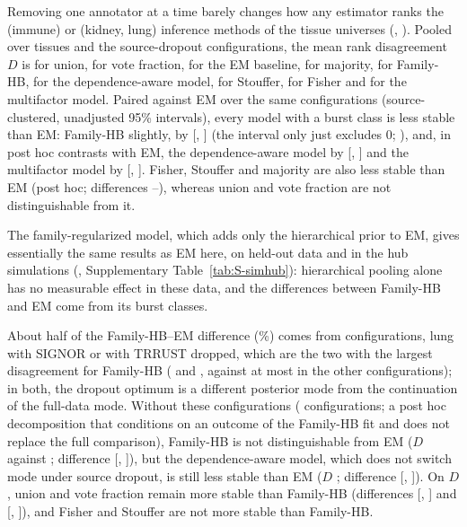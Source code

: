 Removing one annotator at a time barely changes how any estimator ranks the \nRobNMethodsImm{} (immune) or \nRobNMethodsKidLung{} (kidney, lung) inference methods of the tissue universes (, ).
Pooled over tissues and the \nRobNconf{} source-dropout configurations, the mean rank disagreement $D$ is \nRobDUnion{} for union, \nRobDVote{} for vote fraction, \nRobDEm{} for the EM baseline, \nRobDMaj{} for majority, \nRobDHb{} for Family-HB, \nRobDDep{} for the dependence-aware model, \nRobDSto{} for Stouffer, \nRobDFis{} for Fisher and \nRobDMf{} for the multifactor model.
Paired against EM over the same configurations (source-clustered, unadjusted 95\% intervals), every model with a burst class is less stable than EM: Family-HB slightly, by \nRobCtHbEm{} [\nRobCtHbEmLo{}, \nRobCtHbEmHi{}] (the interval only just excludes 0; ), and, in post hoc contrasts with EM, the dependence-aware model by \nRobCtDepEm{} [\nRobCtDepEmLo{}, \nRobCtDepEmHi{}] and the multifactor model by \nRobCtMfEm{} [\nRobCtMfEmLo{}, \nRobCtMfEmHi{}].
Fisher, Stouffer and majority are also less stable than EM (post hoc; differences \nRobCtRuleEmMin{}--\nRobCtRuleEmMax{}), whereas union and vote fraction are not distinguishable from it.


The family-regularized model, which adds only the hierarchical prior to EM, gives essentially the same results as EM here, on held-out data and in the hub simulations (, Supplementary Table~\ref{tab:S-simhub}): hierarchical pooling alone has no measurable effect in these data, and the differences between Family-HB and EM come from its burst classes.

About half of the Family-HB--EM difference (\nRobGapSharePct{}\%) comes from \nRobNswitch{} configurations, lung with SIGNOR or with TRRUST dropped, which are the two with the largest disagreement for Family-HB (\nRobDSwitchMin{} and \nRobDSwitchMax{}, against at most \nRobDNoSwitchMax{} in the other configurations); in both, the dropout optimum is a different posterior mode from the continuation of the full-data mode.
Without these configurations (\nRobNconfNs{} configurations; a post hoc decomposition that conditions on an outcome of the Family-HB fit and does not replace the full comparison), Family-HB is not distinguishable from EM ($D$ \nRobDHbNs{} against \nRobDEmNs{}; difference \nRobCtHbEmNs{} [\nRobCtHbEmNsLo{}, \nRobCtHbEmNsHi{}]), but the dependence-aware model, which does not switch mode under source dropout, is still less stable than EM ($D$ \nRobDDepNs{}; difference \nRobCtDepEmNs{} [\nRobCtDepEmNsLo{}, \nRobCtDepEmNsHi{}]).
On $D$, union and vote fraction remain more stable than Family-HB (differences \nRobCtUnionNs{} [\nRobCtUnionNsLo{}, \nRobCtUnionNsHi{}] and \nRobCtVoteNs{} [\nRobCtVoteNsLo{}, \nRobCtVoteNsHi{}]), and Fisher and Stouffer are not more stable than Family-HB.

